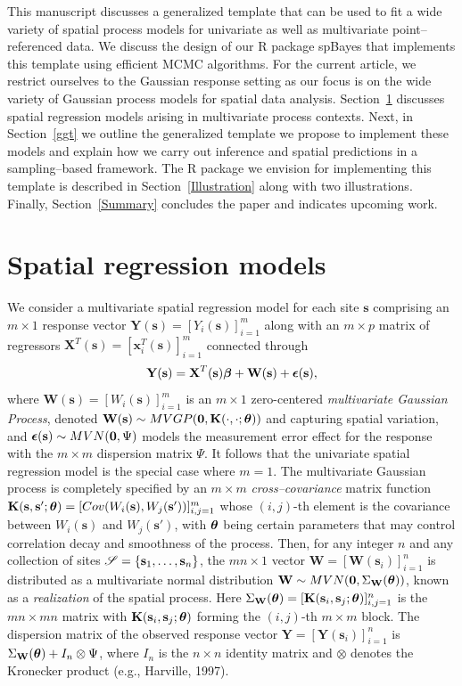 \documentclass[a4paper]{article}
\newcommand{\bbeta}{ \mbox{\boldmath $ \beta $} }
\newcommand{\bepsilon}{ \mbox{\boldmath $\epsilon$}}
\newcommand{\btheta}{ \mbox{\boldmath $ \theta $} }
\newcommand{\bzero}{\textbf{0}}
\newcommand{\bK}{\textbf{K}}
\newcommand{\bs}{\textbf{s}}
\newcommand{\bW}{\textbf{W}}
\newcommand{\bx}{\textbf{x}}
\newcommand{\bX}{\textbf{X}}
\newcommand{\bY}{\textbf{Y}}
\let\proglang=\textsf
\newcommand{\pkg}[1]{{\normalfont\fontseries{b}\selectfont #1}}
\begin{document}
This manuscript discusses a generalized template that can be used to
fit a wide variety of spatial process models for univariate as well
as multivariate point--referenced data. We discuss the design of our
\proglang{R} package \pkg{spBayes} that implements this template
using efficient MCMC algorithms. For the current article, we restrict
ourselves to the Gaussian response setting as our focus is on the
wide variety of Gaussian process models for spatial data analysis. Section~\ref{SpatialRegressionModels} discusses spatial regression
models arising in multivariate process contexts. Next, in
Section~\ref{ggt} we outline the generalized template we propose to
implement these models and explain how we carry out inference and
spatial predictions in a sampling--based framework. The \proglang{R}
package we envision for implementing this template is described in Section~\ref{Illustration} along with two illustrations. Finally,
Section~\ref{Summary} concludes the paper and indicates upcoming work.

\section{Spatial regression models}\label{SpatialRegressionModels}

We consider a multivariate spatial regression model for each site
$\bs$ comprising an $m\times 1$ response vector
$\bY(\bs)=[Y_i(\bs)]_{i=1}^{m}$ along with an $m\times p$ matrix of
regressors $\bX^{T}(\bs)=[\bx_i^{T}(\bs)]_{i=1}^{m}$ connected
through
\begin{equation}\label{MultiSpatialRegressionEqn}
\bY(\bs) = \bX^{T}(\bs)\bbeta + \bW(\bs) + \bepsilon(\bs),
\end{equation}
where $\bW(\bs)=[W_i(\bs)]_{i=1}^{m}$ is an $m\times 1$
zero-centered \emph{multivariate Gaussian Process}, denoted
$\bW(\bs)\sim MVGP(\bzero,\bK(\cdot,\cdot;\btheta))$ and capturing
spatial variation, and $\bepsilon(\bs) \sim MVN(\bzero,\Psi)$ models
the measurement error effect for the response with the $m\times m$
dispersion matrix $\Psi$.  It follows that the univariate spatial regression model is the special case where $m=1$. The multivariate Gaussian process is completely specified by an
$m\times m$ \emph{cross--covariance} matrix function
$\bK(\bs,\bs';\btheta) = [Cov(W_i(\bs),W_j(\bs'))]_{i,j=1}^{m}$
whose $(i,j)$-th element is the covariance between $W_i(\bs)$ and
$W_j(\bs')$, with $\btheta$ being certain parameters that may control
correlation decay and smoothness of the process. Then, for any integer $n$ and any collection of sites
${\cal S}=\{\bs_1,\ldots,\bs_n\}$, the $mn\times 1$ vector $\bW =
[\bW(\bs_i)]_{i=1}^{n}$ is distributed as a multivariate normal
distribution $\bW \sim MVN(\bzero,\Sigma_{\bW}(\btheta))$, known as
a \emph{realization} of the spatial process. Here
$\Sigma_{\bW}(\btheta) = [\bK(\bs_i,\bs_j;\btheta)]_{i,j=1}^{n}$ is
the $mn\times mn$ matrix with $\bK(\bs_i,\bs_j;\btheta)$ forming the
$(i,j)$-th $m\times m$ block. The dispersion matrix of the observed
response vector $\bY=[\bY(\bs_i)]_{i=1}^{n}$ is
$\Sigma_{\bW}(\btheta) + I_{n}\otimes \Psi$, where $I_{n}$ is the
$n\times n$ identity matrix and $\otimes$ denotes the Kronecker
product (e.g., Harville, 1997).
\end{document}
